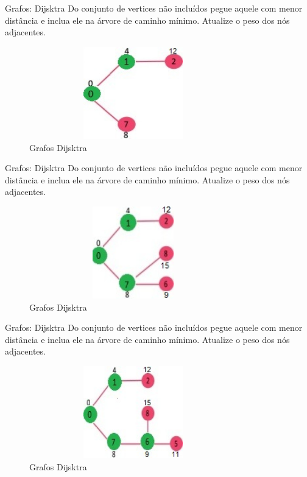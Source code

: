 \begin{frame}
	\begin{block}{Grafos: Dijsktra}
		Do conjunto de vertices não incluídos pegue aquele com menor distância e inclua ele na árvore de caminho mínimo. Atualize o peso dos nós adjacentes.
		\begin{figure}[!htb]
			\centering	  
			\includegraphics[height=4cm, width = 9cm]{./pic/DIJ2.jpg}
			\caption{Grafos Dijsktra}
		\end{figure}
	\end{block}
\end{frame}

\begin{frame}
	\begin{block}{Grafos: Dijsktra}
		Do conjunto de vertices não incluídos pegue aquele com menor distância e inclua ele na árvore de caminho mínimo. Atualize o peso dos nós adjacentes.
		\begin{figure}[!htb]
			\centering	  
			\includegraphics[height=4cm, width = 9cm]{./pic/DIJ3.jpg}
			\caption{Grafos Dijsktra}
		\end{figure}
	\end{block}
\end{frame}

\begin{frame}
	\begin{block}{Grafos: Dijsktra}
		Do conjunto de vertices não incluídos pegue aquele com menor distância e inclua ele na árvore de caminho mínimo. Atualize o peso dos nós adjacentes.
		\begin{figure}[!htb]
			\centering	  
			\includegraphics[height=4cm, width = 9cm]{./pic/DIJ4.jpg}
			\caption{Grafos Dijsktra}
		\end{figure}
	\end{block}
\end{frame}

